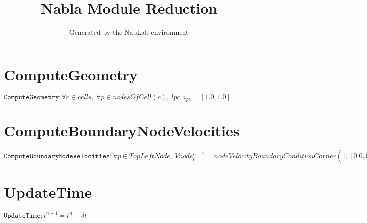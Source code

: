 \documentclass[11pt]{article}
\title{Nabla Module Reduction}
\author{Generated by the NabLab environment}
\begin{document}
\maketitle


\section{ComputeGeometry}
$\texttt{ComputeGeometry} : \forall{c\in cells}, \ \forall{p\in nodesOfCell(c)}, \ lpc\_n_{pc} = \left[1.0,1.0\right]$


\section{ComputeBoundaryNodeVelocities}
$\texttt{ComputeBoundaryNodeVelocities} : \forall{p\in TopLeftNode}, \ Vnode^{n+1}_{p} = nodeVelocityBoundaryConditionCorner\left(1,\left[0.0,0.0\right],1,\left[0.0,0.0\right],\left[\left[1.0,1.0\right],\left[1.0,1.0\right]\right],\left[1.0,1.0\right],\sum_{c\in cellsOfNode(p)}\left(lpc\_n_{pc}\right)\right)$


\section{UpdateTime}
$\texttt{UpdateTime} : t^{n+1} = t^{n} + \delta t$
\end{document}
